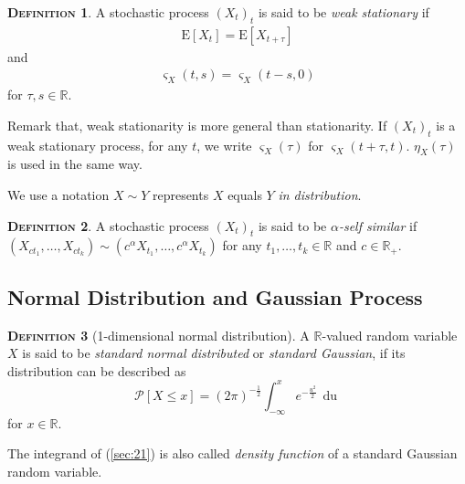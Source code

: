 \documentclass[a4paper, twoside, 11pt]{article}
\theoremstyle{definition}
\newtheorem{definition}{\scshape Definition}[section]
\newcommand{\sqbr}[1]{\left[ {#1} \right]}
\begin{document}
\begin{definition}
  A stochastic process $(X_t)_t$ is said to be \emph{weak  stationary} if 
  \begin{eqnarray*}
	\mathrm{E}[X_t] = \mathrm{E}[X_{t+\tau}]
  \end{eqnarray*}
  and 
  \begin{eqnarray*}
	\varsigma_{X}(t, s) = \varsigma_{X}(t-s, 0)
  \end{eqnarray*}
  for $\tau, s \in \mathbb{R}$.
\end{definition}
Remark that, weak stationarity is more general than stationarity. If $(X_t)_t$ is a weak stationary process, for any $t$, we write $\varsigma_X(\tau)$ for $\varsigma_X(t+\tau, t)$. $\eta_X(\tau)$ is used in the same way. 


We use a notation $X \sim Y$ represents $X$ equals $Y$ \emph{in distribution}. 
\begin{definition}
  A stochastic process $(X_t)_{t}$ is said to be \emph{$\alpha$-self similar} if $(X_{ct_1},\dots,X_{ct_k}) \sim (c^\alpha X_{t_1},\dots, c^\alpha X_{t_k})$ for any $t_1,\dots, t_k \in \mathbb{R}$ and $c\in \mathbb{R}_{+}$.
\end{definition}

\subsection{Normal Distribution and Gaussian Process}
\begin{definition}[1-dimensional normal distribution]
  A $\mathbb{R}$-valued random variable $X$ is said to be \emph{standard normal distributed} or \emph{standard Gaussian}, if its distribution can be described as
  \begin{equation}
	\mathcal{P}\sqbr{X \le x} = (2\pi)^{-\frac{1}{2}}\int_{-\infty}^{x} e^{-\frac{u^2}{2}}\,\mathop{du}  
	\label{sec:21}
  \end{equation}
  for $x \in \mathbb{R}$.
\end{definition}
The integrand of (\ref{sec:21}) is also called \emph{density function} of a standard Gaussian random variable.
\end{document}
